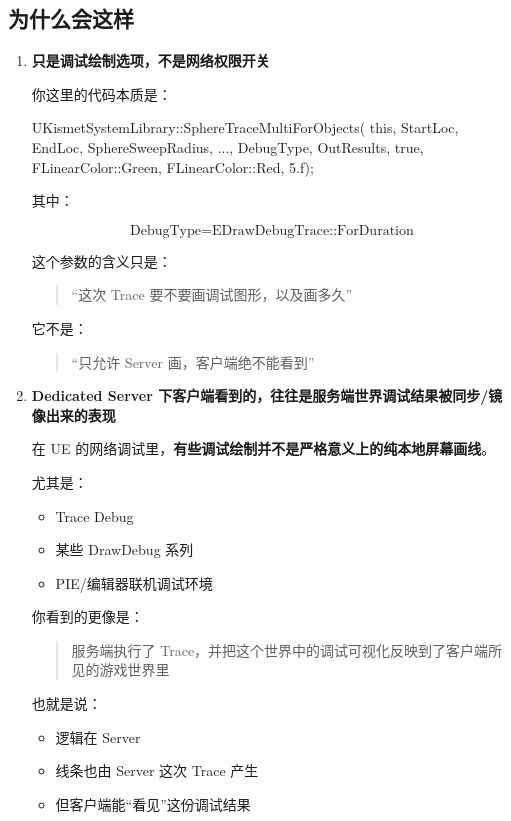 \subsection{为什么会这样}
\begin{enumerate}
	
	\item \textbf{  只是调试绘制选项，不是网络权限开关}
	
	你这里的代码本质是：
	
	\begin{code}
		UKismetSystemLibrary::SphereTraceMultiForObjects(
		this,
		StartLoc,
		EndLoc,
		SphereSweepRadius,
		...,
		DebugType,
		OutResults,
		true,
		FLinearColor::Green,
		FLinearColor::Red,
		5.f);
	\end{code}
	
	其中：
	
	\[
	\text{DebugType} = \text{EDrawDebugTrace::ForDuration}
	\]
	
	这个参数的含义只是：
	
	\begin{quote}
		“这次 Trace 要不要画调试图形，以及画多久”
	\end{quote}
	
	它不是：
	
	\begin{quote}
		“只允许 Server 画，客户端绝不能看到”
	\end{quote}
	
	\item \textbf {Dedicated Server 下客户端看到的，往往是服务端世界调试结果被同步/镜像出来的表现}
	
	在 UE 的网络调试里，\textbf{有些调试绘制并不是严格意义上的纯本地屏幕画线}。
	
	尤其是：
	
	\begin{itemize}
		\item Trace Debug
		\item 某些 DrawDebug 系列
		\item PIE/编辑器联机调试环境
	\end{itemize}
	
	你看到的更像是：
	
	\begin{quote}
		服务端执行了 Trace，并把这个世界中的调试可视化反映到了客户端所见的游戏世界里
	\end{quote}
	
	也就是说：
	
	\begin{itemize}
		\item 逻辑在 Server
		\item 线条也由 Server 这次 Trace 产生
		\item 但客户端能“看见”这份调试结果
	\end{itemize}
	

\end{enumerate}
